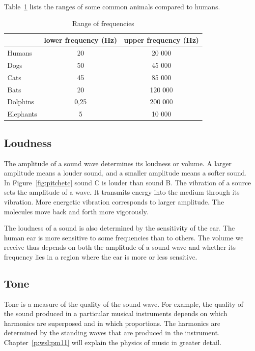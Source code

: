 Table~\ref{p:wsl:s11:rangeoff} lists the ranges of some common animals compared to humans.

\begin{table}[H]
\begin{center}
\caption{Range of frequencies }
\label{p:wsl:s11:rangeoff}
\begin{tabular}{|l|c|c|}\hline
&lower frequency (Hz) & upper frequency (Hz)\\\hline
Humans & 20 & 20 000\\\hline
Dogs & 50 & 45 000\\\hline
Cats & 45 & 85 000\\\hline
Bats & 20 & 120 000\\\hline
Dolphins & 0,25 & 200 000\\\hline
Elephants & 5 & 10 000\\\hline
\end{tabular}
\end{center}
\end{table}


\subsection{Loudness}
The amplitude of a sound wave determines its loudness or volume. A larger amplitude means a louder sound, and a smaller amplitude means a softer sound. In Figure~\ref{fig:pitchetc} sound C is louder than sound B. The vibration of a source sets the amplitude of a wave. It transmits energy into the medium through its vibration. More energetic vibration corresponds to larger amplitude. The molecules move back and forth more vigorously.

The loudness of a sound is also determined by the sensitivity of the ear. The human ear is more sensitive to some frequencies than to others. The volume we receive thus depends on both the amplitude of a sound wave and whether its frequency lies in a region where the ear is more or less sensitive.

\subsection{Tone}
Tone is a measure of the quality of the sound wave. For example, the quality of the sound produced in a particular musical instruments depends on which
harmonics are superposed and in which proportions. The harmonics are determined by the standing waves that are produced in the instrument. Chapter~\ref{p:wsl:pm11} will explain the physics of music in greater detail.

